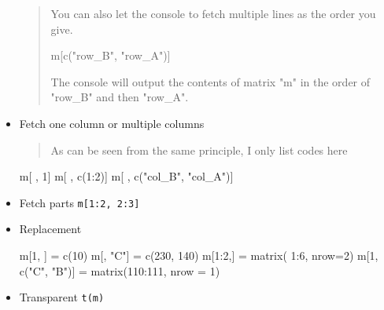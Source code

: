 \documentclass[
]{article}
\newenvironment{Shaded}{}{}
\newcommand{\AttributeTok}[1]{\textcolor[rgb]{0.49,0.56,0.16}{#1}}
\newcommand{\DecValTok}[1]{\textcolor[rgb]{0.25,0.63,0.44}{#1}}
\newcommand{\FunctionTok}[1]{\textcolor[rgb]{0.02,0.16,0.49}{#1}}
\newcommand{\NormalTok}[1]{#1}
\newcommand{\OtherTok}[1]{\textcolor[rgb]{0.00,0.44,0.13}{#1}}
\newcommand{\SpecialCharTok}[1]{\textcolor[rgb]{0.25,0.44,0.63}{#1}}
\newcommand{\StringTok}[1]{\textcolor[rgb]{0.25,0.44,0.63}{#1}}
\begin{document}
\begin{itemize}
  \begin{quote}
  You can also let the console to fetch multiple lines as the order you
  give.

\begin{Shaded}
\begin{Highlighting}[]
\NormalTok{m[}\FunctionTok{c}\NormalTok{(}\StringTok{"row\_B"}\NormalTok{, }\StringTok{"row\_A"}\NormalTok{)]}
\end{Highlighting}
\end{Shaded}

  The console will output the contents of matrix "m" in the order of
  "row\_B" and then "row\_A".
  \end{quote}
\item
  Fetch one column or multiple columns

  \begin{quote}
  As can be seen from the same principle, I only list codes here
  \end{quote}

\begin{Shaded}
\begin{Highlighting}[]
\NormalTok{m[ , }\DecValTok{1}\NormalTok{]}
\NormalTok{m[ , }\FunctionTok{c}\NormalTok{(}\DecValTok{1}\SpecialCharTok{:}\DecValTok{2}\NormalTok{)]}
\NormalTok{m[ , }\FunctionTok{c}\NormalTok{(}\StringTok{"col\_B"}\NormalTok{, }\StringTok{"col\_A"}\NormalTok{)]}
\end{Highlighting}
\end{Shaded}
\item
  Fetch parts \texttt{m{[}1:2,\ 2:3{]}}
\item
  Replacement

\begin{Shaded}
\begin{Highlighting}[]
\NormalTok{m[}\DecValTok{1}\NormalTok{, ] }\OtherTok{=} \FunctionTok{c}\NormalTok{(}\DecValTok{10}\NormalTok{)}
\NormalTok{m[, }\StringTok{"C"}\NormalTok{] }\OtherTok{=} \FunctionTok{c}\NormalTok{(}\DecValTok{230}\NormalTok{, }\DecValTok{140}\NormalTok{)}
\NormalTok{m[}\DecValTok{1}\SpecialCharTok{:}\DecValTok{2}\NormalTok{,] }\OtherTok{=} \FunctionTok{matrix}\NormalTok{( }\DecValTok{1}\SpecialCharTok{:}\DecValTok{6}\NormalTok{, }\AttributeTok{nrow=}\DecValTok{2}\NormalTok{)}
\NormalTok{m[}\DecValTok{1}\NormalTok{, }\FunctionTok{c}\NormalTok{(}\StringTok{"C"}\NormalTok{, }\StringTok{"B"}\NormalTok{)] }\OtherTok{=} \FunctionTok{matrix}\NormalTok{(}\DecValTok{110}\SpecialCharTok{:}\DecValTok{111}\NormalTok{, }\AttributeTok{nrow =} \DecValTok{1}\NormalTok{)}
\end{Highlighting}
\end{Shaded}
\item
  Transparent \texttt{t(m)}
\end{itemize}
\end{document}
